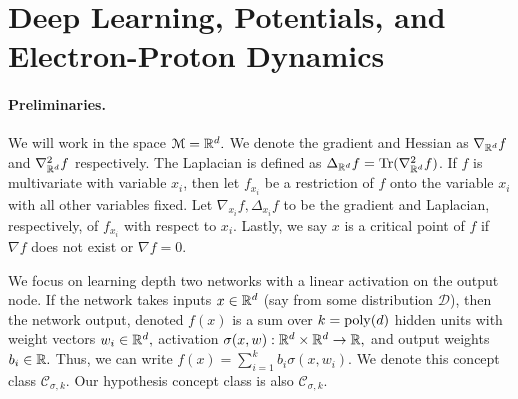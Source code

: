 \section{Deep Learning, Potentials, and Electron-Proton Dynamics}
\label{sec:epdyn}
\paragraph{Preliminaries.}
We will work in the space  $\mathcal{M}= {\mathbb{R}}^d.$ 
We denote the gradient and Hessian as $\nabla_{{\mathbb{R}}^d} f$ and  $\nabla_{{\mathbb{R}}^d}^2 f$ respectively.
The Laplacian is defined as
$\Delta_{{\mathbb{R}}^d} f = \operatorname{Tr}(\nabla_{{\mathbb{R}}^d}^2 f)$. 
%
If $f$ is multivariate with variable $x_i$, then let $f_{x_i}$ be a
restriction of $f$ onto the variable $x_i$ with all other variables
fixed. Let $\nabla_{x_i}f, \Delta_{x_i}f$ to be the gradient and
Laplacian, respectively, of $f_{x_i}$ with respect to $x_i$. Lastly,
we say $x$ is a critical point of $f$ if $\nabla f$ does not exist or
$\nabla f = 0$. 

We focus on learning depth two networks with a linear activation on
the output node. If the network takes inputs $x \in {\mathbb{R}}^d$ (say from
some distribution $\mathcal{D}$), then the network output, denoted
$f(x)$ is a sum over $k = \mathrm{poly}(d)$ hidden units with weight vectors
$w_{i} \in {\mathbb{R}}^d,$ activation $\sigma(x,w):{\mathbb{R}}^d \times {\mathbb{R}}^d\to {\mathbb{R}},$ and
output weights $b_i \in {\mathbb{R}}.$ Thus, we can write
$f(x) = \sum_{i=1}^k b_i\sigma(x,w_i)$. We denote this concept class
$\mathcal{C}_{\sigma,k}.$ Our hypothesis concept class is also
$\mathcal{C}_{\sigma,k}.$ 





 

